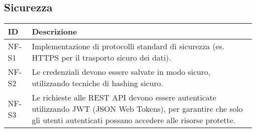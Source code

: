 \subsection*{Sicurezza}

\begin{table}[H]
    \centering
    \renewcommand{\arraystretch}{1.3} %
    
    \begin{tabular}{|p{3cm}|p{10cm}|} 
        \hline
        \textbf{ID} & \textbf{Descrizione} \\  
        \hline
        NF-S1 &  Implementazione di protocolli standard di sicurezza (es. HTTPS per il trasporto sicuro
        dei dati). \\ 
        \hline
        NF-S2 &  Le credenziali devono essere salvate in modo sicuro, utilizzando tecniche di hashing sicuro. \\ 
        \hline
        NF-S3 &  Le richieste alle REST API devono essere autenticate utilizzando JWT (JSON Web Tokens), per garantire che solo gli utenti autenticati possano accedere alle risorse protette. \\ 
        \hline
    \end{tabular}
    
\end{table}